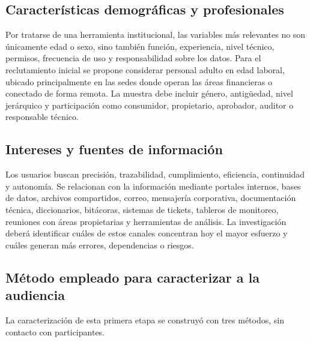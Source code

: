\subsection{Características demográficas y profesionales}

Por tratarse de una herramienta institucional, las variables más relevantes no son
únicamente edad o sexo, sino también función, experiencia, nivel técnico, permisos,
frecuencia de uso y responsabilidad sobre los datos. Para el reclutamiento inicial se
propone considerar personal adulto en edad laboral, ubicado principalmente en las sedes
donde operan las áreas financieras o conectado de forma remota. La muestra debe incluir
género, antigüedad, nivel jerárquico y participación como consumidor, propietario,
aprobador, auditor o responsable técnico.

\begin{uxlist}
\end{uxlist}

\subsection{Intereses y fuentes de información}

Los usuarios buscan precisión, trazabilidad, cumplimiento, eficiencia, continuidad y
autonomía. Se relacionan con la información mediante portales internos, bases de datos,
archivos compartidos, correo, mensajería corporativa, documentación técnica, diccionarios,
bitácoras, sistemas de tickets, tableros de monitoreo, reuniones con áreas propietarias y
herramientas de análisis. La investigación deberá identificar cuáles de estos canales
concentran hoy el mayor esfuerzo y cuáles generan más errores, dependencias o riesgos.

\subsection{Método empleado para caracterizar a la audiencia}

La caracterización de esta primera etapa se construyó con tres métodos, sin contacto con
participantes.

